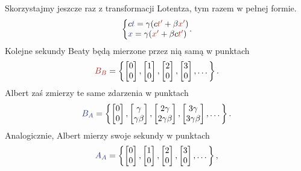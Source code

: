 \documentclass[10pt,twocolumn,fleqn,polish]{article}
\makeatletter
\providecommand{\mathcolor}[2]{{\color{#1}#2}}
\newcommand{\mred}[1]{\mathcolor{BrickRed}{#1}}
\newcommand{\mblue}[1]{\mathcolor{Blue}{#1}}
\newenvironment{eqsystem}
  {\left\lbrace
    \begin{array}{@{}l@{}}}
  {\end{array}\right.}
\makeatother
\begin{document}
Skorzystajmy jeszcze raz z transformacji Lotentza, tym razem w pełnej formie.
\[
  \begin{eqsystem}
    c\mblue{t} = \gamma (c\mred{t'} + \beta \mred{x'}) \\
    \mblue{x} = \gamma (\mred{x'} + \beta c\mred{t'})
  \end{eqsystem}.
\]
Kolejne sekundy Beaty będą mierzone przez nią samą w punktach
\[
  \mred{B_B} = \left\{
  \begin{bmatrix} 0 \\ 0 \end{bmatrix},
  \begin{bmatrix} 1 \\ 0 \end{bmatrix},
  \begin{bmatrix} 2 \\ 0 \end{bmatrix},
  \begin{bmatrix} 3 \\ 0 \end{bmatrix},
  \dots
  \right\}.
\]
Albert zaś zmierzy te same zdarzenia w punktach
\[
  \mblue{B_A} = \left\{
  \begin{bmatrix} 0 \\ 0 \end{bmatrix},
  \begin{bmatrix} \gamma \\ \gamma\beta \end{bmatrix},
  \begin{bmatrix} 2\gamma \\ 2\gamma\beta \end{bmatrix},
  \begin{bmatrix} 3\gamma \\ 3\gamma\beta \end{bmatrix},
  \dots
  \right\}.
\]
Analogicznie, Albert mierzy swoje sekundy w punktach
\[
  \mblue{A_A} = \left\{
  \begin{bmatrix} 0 \\ 0 \end{bmatrix},
  \begin{bmatrix} 1 \\ 0 \end{bmatrix},
  \begin{bmatrix} 2 \\ 0 \end{bmatrix},
  \begin{bmatrix} 3 \\ 0 \end{bmatrix},
  \dots
  \right\},
\]
\end{document}
